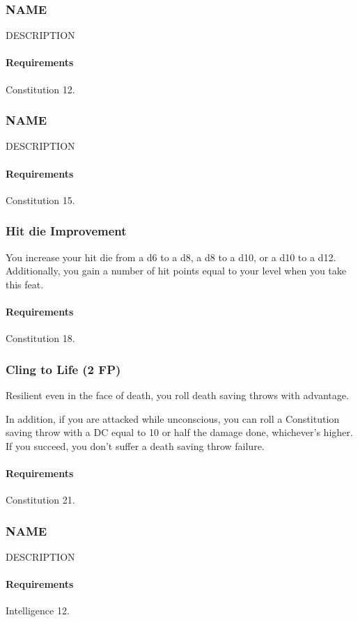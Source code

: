\subsubsection{NAME} \label{feat::name}
    DESCRIPTION
    \paragraph{Requirements} Constitution 12.
\subsubsection{NAME} \label{feat::name}
    DESCRIPTION
    \paragraph{Requirements} Constitution 15.
\subsubsection{Hit die Improvement} \label{feat::hitdieimprovement}
    You increase your hit die from a d6 to a d8, a d8 to a d10, or a d10 to a d12.
    Additionally, you gain a number of hit points equal to your level when you take this feat.
    \paragraph{Requirements} Constitution 18.
\subsubsection{Cling to Life (2 FP)} \label{feat::clingtolife}
    Resilient even in the face of death, you roll death saving throws with advantage.

    In addition, if you are attacked while unconscious, you can roll a Constitution saving throw with a DC equal to 10 or half the damage done, whichever's higher.
    If you succeed, you don't suffer a death saving throw failure.
    \paragraph{Requirements} Constitution 21.
\subsubsection{NAME} \label{feat::name}
    DESCRIPTION
    \paragraph{Requirements} Intelligence 12.
